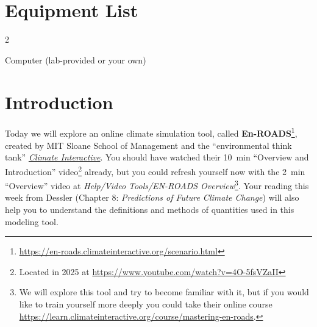 

\section*{Equipment List}

\begin{multicols}{2}   %
\begin{equipment}
\item Computer (lab-provided or your own)
\end{equipment}
\end{multicols}


\section{Introduction}

Today we will explore an online climate simulation tool, called {\bf En-ROADS}\footnote{\url{https://en-roads.climateinteractive.org/scenario.html}}, created by MIT Sloane School of Management and the ``environmental think tank''  \href{https://www.influencewatch.org/non-profit/climate-interactive/}{\em Climate Interactive}. You should have watched their 10~min ``Overview and Introduction'' video\footnote{Located in 2025 at \url{https://www.youtube.com/watch?v=4O-5fsVZaII}} already, but you could refresh yourself now with the 2~min ``Overview'' video at {\em Help/Video Tools/EN-ROADS Overview}\footnote{We will explore this tool and try to become familiar with it, but if you would like to train yourself more deeply you could take their online course \url{https://learn.climateinteractive.org/course/mastering-en-roads}.}.  Your reading this week from Dessler (Chapter 8: {\em Predictions of Future Climate Change}) will also help you to understand the definitions and methods of quantities used in this modeling tool.

